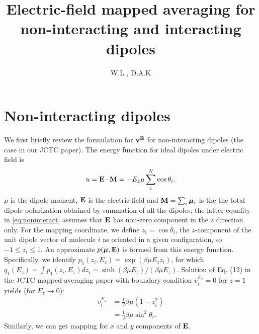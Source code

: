 \documentclass[11pt,reqno]{amsart}
\title{Electric-field mapped averaging for non-interacting and interacting dipoles}
\author{W.L , D.A.K}
\date{}                                           %
\begin{document}
\maketitle
\section{Non-interacting dipoles}
We first briefly review the formulation for ${\bf v}^{\bf E}$ for non-interacting dipoles (the case in our JCTC paper). The energy function for ideal dipoles under electric field is
\begin{equation}
\label{eq:noninteract}
u ={{\bf E} \cdot {\bf M}}= -E_z\mu\sum_i^N \cos\theta_i.
\end{equation}
$\mu$ is the dipole moment, ${\bf E}$ is the electric field and ${\bf M}=\sum_{i}{\boldsymbol \mu}_i$ is the the total dipole polarization obtained by summation of all the dipoles; the latter equality in \eqref{eq:noninteract} assumes that ${\bf E}$ has non-zero component in the $z$ direction only. For the mapping coordinate, we define $z_i = \cos\theta_i$, the $z$-component of the unit dipole vector of molecule $i$ as oriented in a given configuration, so $-1\le z_i \le 1$. An approximate $p(\boldsymbol\mu,{\bf E})$ is formed from this energy function. Specifically, we identify $p_1(z_i,{E}_z) = \exp\left(\beta\mu { E}_z z_i\right)$, for which $q_1(E_z)=\int p_1(z_i,{E}_z)dz_i= \sinh\left(\beta\mu E_z\right)/(\beta\mu E_z)$. Solution of Eq. (12) in the JCTC mapped-averaging paper with boundary condition $v^{E_z}_{i} = 0$ for $z = 1$ yields (for $E_z \to 0$):
\begin{align}
\label{eq:noninteractMap}
v^{E_z}_{i} &=\frac{1}{2}\beta\mu(1-z_i^2)\\
&=\frac{1}{2}\beta\mu \sin^2\theta_i\nonumber.
\end{align}
Similarly, we can get mapping for $x$ and $y$ components of ${\bf E}$.\\
\end{document}
